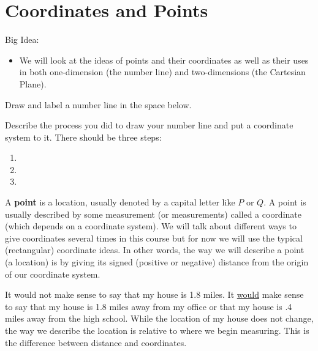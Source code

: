 \section{Coordinates and Points}
Big Idea:
\begin{itemize}
\item We will look at the ideas of points and their coordinates as well as their uses in both one-dimension (the number line) and two-dimensions (the Cartesian Plane).
\end{itemize}

\bq\label{q1} Draw and label a number line in the space below.
\begin{annotation}

\end{annotation}

\vspace{1.5in}

Describe the process you did to draw your number line and put a coordinate system to it. There should be three steps:
\begin{enumerate}
\item
\item
\item
\end{enumerate}

\eq

\begin{info} A \textbf{point} is a location, usually denoted by a capital letter like $P$ or $Q$. A point is usually described by some measurement (or measurements) called a coordinate (which depends on a coordinate system). We will talk about different ways to give coordinates several times in this course but for now we will use the typical (rectangular) coordinate ideas. In other words, the way we will describe a point (a location) is by giving its signed (positive or negative) distance from the origin of our coordinate system.

It would not make sense to say that my house is 1.8 miles. It  \underline{would} make sense to say that my house is 1.8 miles away from my office or that my house is .4 miles away from the high school. While the location of my house does not change, the way we describe the location is relative to where we begin measuring. This is the difference between distance and coordinates. \end{info}

